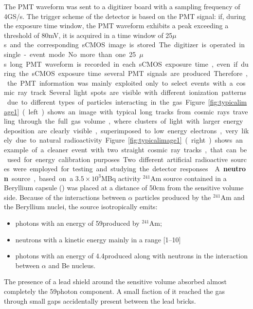\documentclass[12pt]{iopart}
\begin{document}
The PMT waveform was sent to a digitizer board with a sampling
frequency of 4\unit{GS/s}. The  trigger scheme of the detector is based on
the PMT signal: if, during the exposure time window, the PMT waveform exhibits a peak exceeding a threshold of 80\unit{mV}, it is acquired in a time
window of 25\unit{$\mu$s} and the corresponding sCMOS image is stored.
The digitizer is operated in single-event mode. No more than one  25\unit{$\mu$s} long PMT waveform
 is recorded in each sCMOS exposure time, even if during the sCMOS exposure time several PMT signals are produced.  Therefore, the PMT
information was mainly exploited only to select events with a cosmic ray
track.




Several light spots are visible with different ionization patterns due
to different types of particles interacting in the gas.
Figure~\ref{fig:typicalimage1} (left) shows an image with typical long
tracks from cosmic rays traveling through the full gas volume, where
clusters of light with larger energy deposition are clearly visible,
superimposed to low energy electrons, very likely due to natural
radioactivity.  Figure~\ref{fig:typicalimage1} (right) shows an
example of a cleaner event with two straight cosmic ray tracks, that
can be used for energy calibration purposes.

Two different artificial radioactive sources were employed for testing and studying the detector responses.

\vspace{10pt}

A {\bf neutron} source, based on a $3.5{\times}10^3$\unit{MBq} activity
$^{241}$Am source contained in a Beryllium capsule (\ambe) was placed
at a distance of 50\unit{cm} from the sensitive volume side.  Because
of the interactions between $\alpha$ particles produced by the
$^{241}$Am and the Beryllium nuclei, the \ambe source isotropically
emits:
 \begin{itemize}
     \item photons with an energy of 59\keV produced by $^{241}$Am;
     \item neutrons with a kinetic energy mainly in a range
       [1--10]\MeV
     \item photons with an energy of 4.4\MeV produced along with
       neutrons in the interaction between $\alpha$ and Be nucleus.
 \end{itemize}
 The presence of a lead shield around the sensitive volume absorbed
almost completely the 59\keV photon component. A small faction of it
reached the gas through small gaps accidentally present between the lead
bricks.
\end{document}
